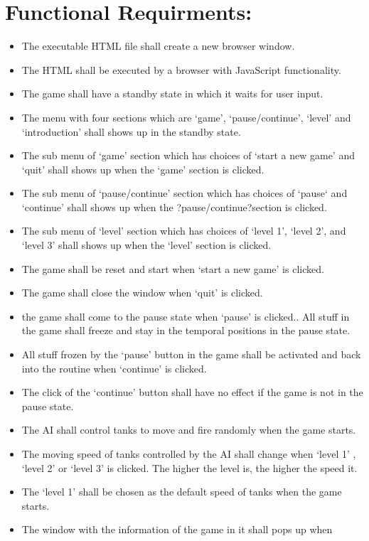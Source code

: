 \documentclass{article}
\begin{document}
\section {Functional Requirments:}
\begin{itemize}
\item The executable HTML file shall create a new browser window.
\item The HTML shall be executed by a browser with JavaScript functionality.
\item The game shall have a standby state in which it waits for user input.
\item The menu with four sections which are `game', `pause/continue', `level' and
 `introduction' shall shows up in the standby state.
\item The sub menu of `game' section which has choices of `start a new game' and 
`quit' shall shows up when the `game' section is clicked.
\item The sub menu of  `pause/continue' section which has choices of `pause‘ and  
`continue' shall shows up when the ?pause/continue?section is clicked.
\item The sub menu of  `level' section which has choices of `level 1', `level 2',
 and `level 3' shall shows up when the `level' section is clicked.
\item The game shall be reset and start when `start a new game' is clicked.
\item The game shall close the window when `quit' is clicked.
\item the game shall come to the pause state when `pause' is clicked.. All stuff 
in the game shall freeze and stay in the temporal positions in the pause state.
\item All stuff frozen by the `pause' button in the game shall be activated and
 back into the routine when `continue' is clicked.
\item The click of the `continue' button shall have no effect if the game is not
 in the pause state.
\item The AI shall control tanks to move and fire randomly when the game starts.
\item The moving speed of tanks controlled by the AI shall change when `level 1'
, `level 2' or `level 3' is clicked. The higher the level is, the higher the speed
 it.
\item The `level 1' shall be chosen as the default speed of tanks when the game 
starts.
\item The window with the information of the game in it shall pops up when 

\end{itemize}
\end{document}
